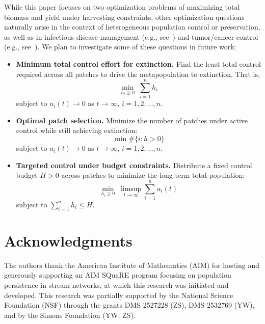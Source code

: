\documentclass[11pt]{article}
\theoremstyle{definition}
\begin{document}
While this paper focuses on two optimization problems of maximizing total biomass and yield under harvesting constraints, other optimization questions naturally arise in the context of heterogeneous population control or preservation, as well as in infectious disease management (e.g., see~\cite{d2012efficacy}) and tumor/cancer control (e.g., see~\cite{hillen2009user}). We plan to investigate some of these questions in future work:
\begin{itemize}
\item
{\bf Minimum total control effort for extinction.} Find the least total control required across all patches to drive the metapopulation to extinction. That is, 
$$\min_{h_i\ge 0} \; \sum_{i=1}^n h_i$$
subject to $u_i(t) \to 0$ as $t\to \infty$, $i=1,2,\ldots, n$.

\item {\bf Optimal patch selection.} Minimize the number of patches under active control while still achieving extinction: 
$$\min \#\{i: h>0\}$$
subject to $u_i(t)\to 0$ as $t\to\infty$, $i=1,2,\ldots, n$.

\item {\bf Targeted control under budget constraints.} Distribute a fixed control budget $H>0$ across patches to minimize the long-term total population:
$$\min_{h_i \ge 0} \; \limsup_{t\to\infty} \sum_{i=1}^n u_i(t)$$
subject to $\sum_{i=1}^n h_i \le H$.
\end{itemize}%






\section*{Acknowledgments}
The authors thank the American Institute of Mathematics
(AIM) for hosting and generously supporting an AIM SQuaRE program focusing on
population persistence in stream networks, at which this research was initiated and developed. This research was partially supported by the National Science Foundation (NSF) through the grants DMS 2527228 (ZS), DMS 2532769 (YW), and by the Simons Foundation (YW; ZS).




\end{document}
